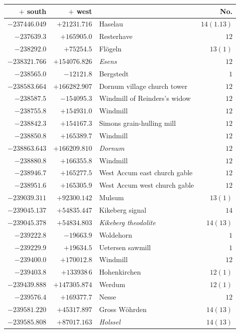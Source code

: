 \clearpage{}%
\begin{center}\begingroup\fontsize{8}{9}\selectfont
\setlength{\tabcolsep}{4pt}
\begin{tabular}{r|r|p{170pt}|r}\hline
\(+\) south&\(+\) west&&No.\\\hline
\(-237446.049\)&\(+21231.716\)&Haselau&\(14(1.13)\)\\
\(-237639.3\)&\(+165905.0\)&Resterhave&\(12\)\\
\(-238292.0\)&\(+75254.5\)&Flögeln&\(13(1)\)\\
\(-238321.766\)&\(+154076.826\)&\textit{Esens}&\(12\)\\
\(-238565.0\)&\(-12121.8\)&Bergstedt&\(1\)\\
\(-238583.664\)&\(+166282.907\)&Dornum village church tower&\(12\)\\
\(-238587.5\)&\(-154095.3\)&Windmill of Reinders’s widow&\(12\)\\
\(-238755.8\)&\(+154931.0\)&Windmill&\(12\)\\
\(-238842.3\)&\(+154167.3\)&Simons grain-hulling mill&\(12\)\\
\(-238850.8\)&\(+165389.7\)&Windmill&\(12\)\\
\(-238863.643\)&\(+166209.810\)&\textit{Dornum}&\(12\)\\
\(-238880.8\)&\(+166355.8\)&Windmill&\(12\)\\
\(-238946.7\)&\(+165277.5\)&West Accum east church gable&\(12\)\\
\(-238951.6\)&\(+165305.9\)&West Accum west church gable&\(12\)\\
\(-239039.311\)&\(+92300.142\)&Mulsum&\(13(1)\)\\
\(-239045.137\)&\(+54835.447\)&Kikeberg signal&\(14\)\\
\(-239045.378\)&\(+54834.803\)&\textit{Kikeberg theodolite}&\(14(13)\)\\
\(-239222.8\)&\(-19663.9\)&Woldehorn&\(1\)\\
\(-239229.9\)&\(+19634.5\)&Uetersen sawmill&\(1\)\\
\(-239400.0\)&\(+170012.8\)&Windmill&\(12\)\\
\(-239403.8\)&\(+133938\,6\)&Hohenkirchen&\(12(1)\)\\
\(-239439.888\)&\(+147305.874\)&Werdum&\(12(1)\)\\
\(-239576.4\)&\(+169377.7\)&Nesse&\(12\)\\
\(-239581.220\)&\(+45317.897\)&Gross Wöhrden&\(14(13)\)\\
\(-239585.808\)&\(+87017.163\)&\textit{Holssel}&\(14(13)\)\\

\end{tabular}
\end{center}

